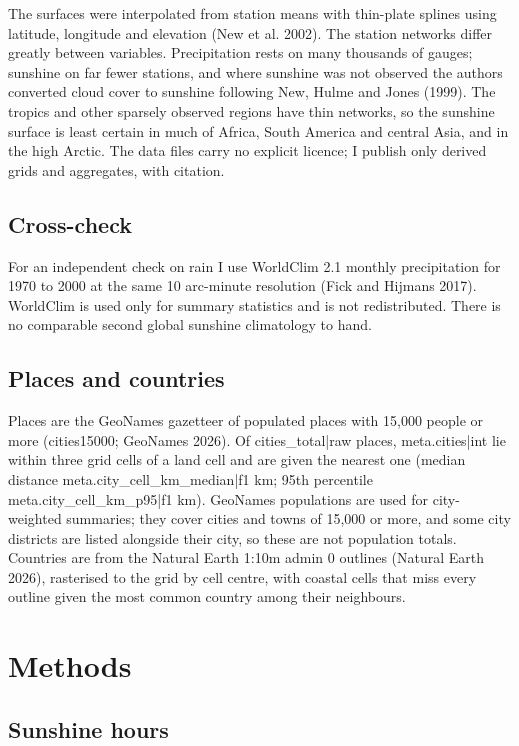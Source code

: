 \documentclass[11pt,a4paper]{article}
\begin{document}
The surfaces were interpolated from station means with thin-plate splines using latitude, longitude and elevation (New et al. 2002). The station networks differ greatly between variables. Precipitation rests on many thousands of gauges; sunshine on far fewer stations, and where sunshine was not observed the authors converted cloud cover to sunshine following New, Hulme and Jones (1999). The tropics and other sparsely observed regions have thin networks, so the sunshine surface is least certain in much of Africa, South America and central Asia, and in the high Arctic. The data files carry no explicit licence; I publish only derived grids and aggregates, with citation.

\subsection{Cross-check}

For an independent check on rain I use WorldClim 2.1 monthly precipitation for 1970 to 2000 at the same 10 arc-minute resolution (Fick and Hijmans 2017). WorldClim is used only for summary statistics and is not redistributed. There is no comparable second global sunshine climatology to hand.

\subsection{Places and countries}

Places are the GeoNames gazetteer of populated places with 15,000 people or more (cities15000; GeoNames 2026). Of {{cities_total|raw}} places, {{meta.cities|int}} lie within three grid cells of a land cell and are given the nearest one (median distance {{meta.city_cell_km_median|f1}} km; 95th percentile {{meta.city_cell_km_p95|f1}} km). GeoNames populations are used for city-weighted summaries; they cover cities and towns of 15,000 or more, and some city districts are listed alongside their city, so these are not population totals. Countries are from the Natural Earth 1:10m admin 0 outlines (Natural Earth 2026), rasterised to the grid by cell centre, with coastal cells that miss every outline given the most common country among their neighbours.

\section{Methods}

\subsection{Sunshine hours}
\end{document}
